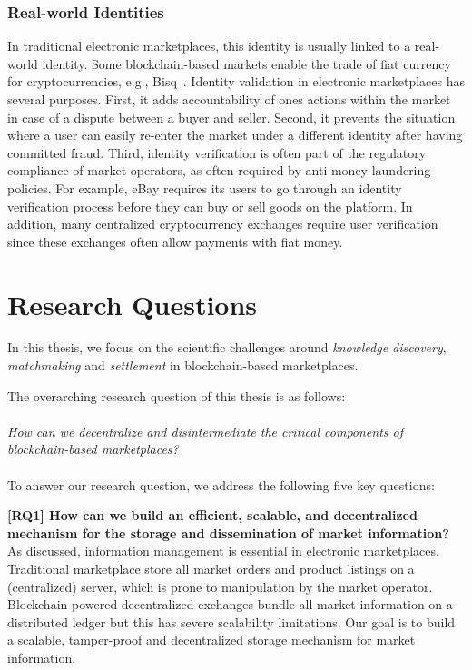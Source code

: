 \subsubsection{Real-world Identities}
In traditional electronic marketplaces, this identity is usually linked to a real-world identity.
Some blockchain-based markets enable the trade of fiat currency for cryptocurrencies, e.g., Bisq~\cite{bisq}.
Identity validation in electronic marketplaces has several purposes.
First, it adds accountability of ones actions within the market in case of a dispute between a buyer and seller.
Second, it prevents the situation where a user can easily re-enter the market under a different identity after having committed fraud.
Third, identity verification is often part of the regulatory compliance of market operators, as often required by anti-money laundering policies.
For example, eBay requires its users to go through an identity verification process before they can buy or sell goods on the platform.
In addition, many centralized cryptocurrency exchanges require user verification since these exchanges often allow payments with fiat money.

\section{Research Questions}
\label{sec:research_questions}
In this thesis, we focus on the scientific challenges around \emph{knowledge discovery}, \emph{matchmaking} and \emph{settlement} in blockchain-based marketplaces.

The overarching research question of this thesis is as follows:\\\\
\emph{How can we decentralize and disintermediate the critical components of blockchain-based marketplaces?}\\\\
To answer our research question, we address the following five key questions:

\textbf{[RQ1] How can we build an efficient, scalable, and decentralized mechanism for the storage and dissemination of market information?}
As discussed, information management is essential in electronic marketplaces.
Traditional marketplace store all market orders and product listings on a (centralized) server, which is prone to manipulation by the market operator.
Blockchain-powered decentralized exchanges bundle all market information on a distributed ledger but this has severe scalability limitations.
Our goal is to build a scalable, tamper-proof and decentralized storage mechanism for market information.

